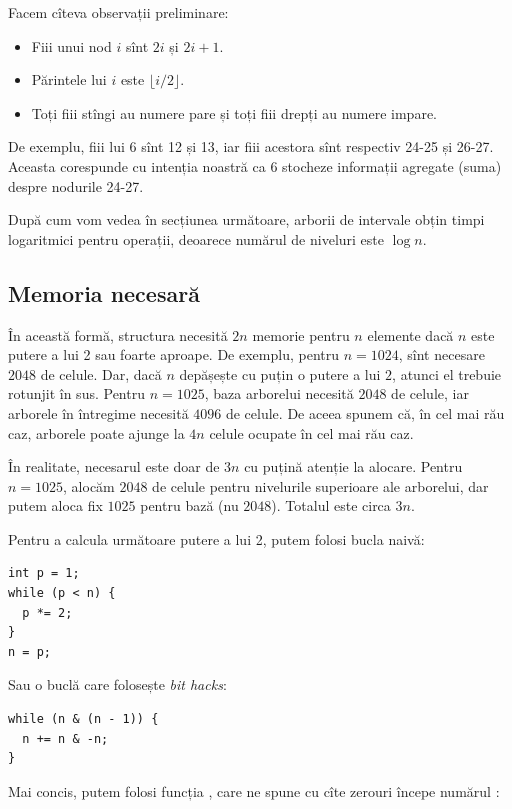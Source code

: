 Facem cîteva observații preliminare:

\begin{itemize}
  \item Fiii unui nod $i$ sînt $2i$ și $2i + 1$.
  \item Părintele lui $i$ este $\lfloor i / 2 \rfloor$.
  \item Toți fiii stîngi au numere pare și toți fiii drepți au numere impare.
\end{itemize}

De exemplu, fiii lui 6 sînt 12 și 13, iar fiii acestora sînt respectiv 24-25 și 26-27. Aceasta corespunde cu intenția noastră ca 6 stocheze informații agregate (suma) despre nodurile 24-27.

După cum vom vedea în secțiunea următoare, arborii de intervale obțin timpi logaritmici pentru operații, deoarece numărul de niveluri este $\log n$.

\subsection{Memoria necesară}

În această formă, structura necesită $2n$ memorie pentru $n$ elemente dacă $n$ este putere a lui 2 sau foarte aproape. De exemplu, pentru $n = 1024$, sînt necesare $2048$ de celule. Dar, dacă $n$ depășește cu puțin o putere a lui $2$, atunci el trebuie rotunjit în sus. Pentru $n = 1025$, baza arborelui necesită $2048$ de celule, iar arborele în întregime necesită $4096$ de celule. De aceea spunem că, în cel mai rău caz, arborele poate ajunge la $4n$ celule ocupate în cel mai rău caz.

În realitate, necesarul este doar de $3n$ cu puțină atenție la alocare. Pentru $n = 1025$, alocăm $2048$ de celule pentru nivelurile superioare ale arborelui, dar putem aloca fix $1025$ pentru bază (nu $2048$). Totalul este circa $3n$.

Pentru a calcula următoare putere a lui 2, putem folosi bucla naivă:

\begin{verbatim}
int p = 1;
while (p < n) {
  p *= 2;
}
n = p;
\end{verbatim}

Sau o buclă care folosește \textit{bit hacks}:

\begin{verbatim}
while (n & (n - 1)) {
  n += n & -n;
}
\end{verbatim}

Mai concis, putem folosi funcția , care ne spune cu cîte zerouri începe numărul :

